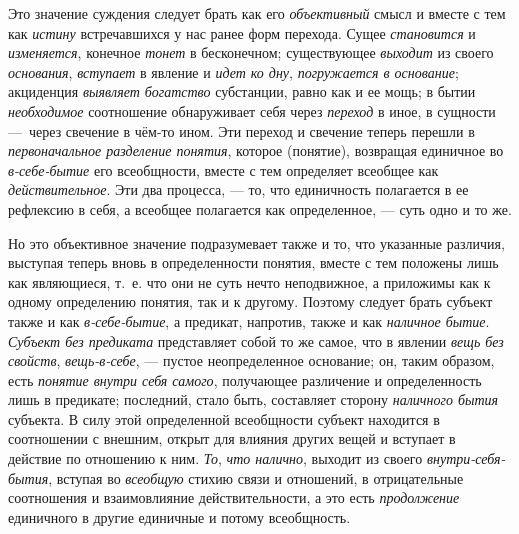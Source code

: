 \documentclass[twoside]{article}
\begin{document}
{{{{\label{bkm:bm31a}Это значение суждения следует брать как его
{\em объективный} смысл и
вместе с тем как {\em истину}
встречавшихся у нас ранее форм перехода. Сущее
{\em становится} и
{\em изменяется},
конечное {\em тонет}
в бесконечном; существующее
{\em выходит} из своего
{\em основания},
{\em вступает} в явление и
{\em идет ко дну},
{\em погружается в основание};
акциденция {\em выявляет
богатство }субстанции, равно как и ее мощь; в бытии
{\em необходимое}
соотношение обнаруживает себя через
{\em переход} в иное, в
сущности —~через свечение в чём-то ином. Эти переход и
свечение теперь перешли в
{\em первоначальное разделение
понятия}, которое (понятие), возвращая единичное во
{\em в-себе-бытие} его
всеобщности, вместе с тем определяет всеобщее как
{\em действительное}. Эти
два процесса, — то, что единичность полагается в ее
рефлексию в себя, а всеобщее полагается как определенное, —
суть одно и то же.

Но это объективное значение подразумевает также и то, что
указанные различия, выступая теперь вновь в определенности понятия, вместе
с тем положены лишь как являющиеся, т.~е. что они не суть нечто
неподвижное, а приложимы как к одному определению понятия, так и к другому.
Поэтому следует брать субъект также и как
{\em в-себе-бытие}, а
предикат, напротив, также и как
{\em наличное бытие}.
{\em Субъект без предиката}
представляет собой то же самое, что в явлении
{\em вещь без свойств},
{\em вещь-в-себе}, —
пустое неопределенное основание; он, таким образом, есть
{\em понятие внутри себя самого},
получающее различение и определенность лишь в предикате;
последний, стало быть, составляет сторону
{\em наличного бытия}
субъекта. В силу этой определенной всеобщности субъект
находится в соотношении с внешним, открыт для влияния других вещей и
вступает в действие по отношению к ним.
{\em То},
{\em что налично}, выходит
из своего {\em внутри-себя-бытия},
вступая во {\em всеобщую}
стихию связи и отношений, в отрицательные соотношения и
взаимовлияние действительности, а это есть
{\em продолжение}
единичного в другие единичные и потому всеобщность.

}}}}
\end{document}
